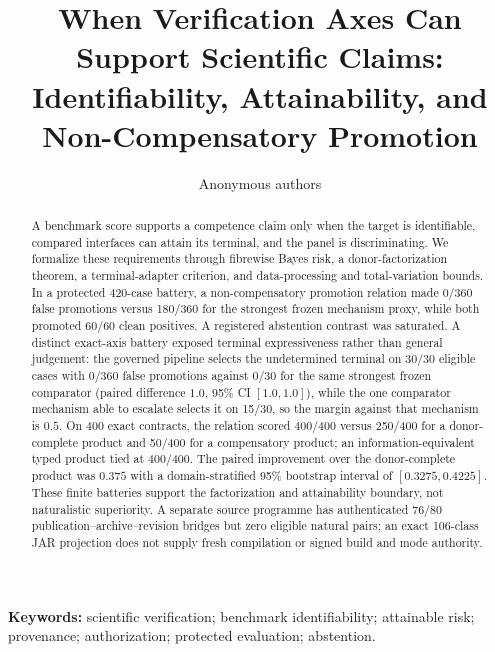 \documentclass[10pt]{article}
\title{When Verification Axes Can Support Scientific Claims:\\
Identifiability, Attainability, and Non-Compensatory Promotion}
\author{Anonymous authors}
\begin{document}
\maketitle

\begin{abstract}
A benchmark score supports a competence claim only when the target is
identifiable, compared interfaces can attain its terminal, and the panel is
discriminating.  We formalize these requirements through fibrewise Bayes risk,
a donor-factorization theorem, a terminal-adapter criterion, and
data-processing and total-variation bounds.  In a protected 420-case battery,
a non-compensatory promotion relation made 0/360 false promotions versus
180/360 for the strongest frozen mechanism proxy, while both promoted 60/60
clean positives.  A registered abstention contrast was saturated.  A distinct
exact-axis battery exposed terminal expressiveness rather than general
judgement: the governed pipeline selects the undetermined terminal on 30/30
eligible cases with 0/360 false promotions against 0/30 for the same strongest
frozen comparator (paired difference $1.0$, 95\% CI $[1.0,1.0]$), while the one
comparator mechanism able to escalate selects it on 15/30, so the margin
against that mechanism is $0.5$.  On 400 exact contracts, the relation scored 400/400 versus 250/400
for a donor-complete product and 50/400 for a compensatory product; an
information-equivalent typed product tied at 400/400.  The paired improvement
over the donor-complete product was $0.375$ with a domain-stratified 95\%
bootstrap interval of $[0.3275,0.4225]$.  These finite batteries support the
factorization and attainability boundary, not naturalistic superiority.  A
separate source programme has authenticated 76/80 publication--archive--revision
bridges but zero eligible natural pairs; an exact 106-class JAR projection does
not supply fresh compilation or signed build and mode authority.
\end{abstract}

\noindent\textbf{Keywords:} scientific verification; benchmark identifiability; attainable risk; provenance; authorization; protected evaluation; abstention.















\end{document}
